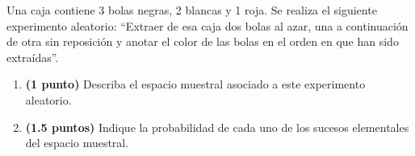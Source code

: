 
Una caja contiene 3 bolas negras, 2 blancas y 1 roja. Se realiza el siguiente experimento aleatorio: ``Extraer de esa caja dos bolas al azar, una a continuación de otra sin reposición y anotar el color de las bolas en el orden en que han sido extraídas''.
\begin{enumerate}[label=\alph*)]
\item \textbf{(1 punto)} Describa el espacio muestral asociado a este experimento aleatorio.
\item \textbf{(1.5 puntos)} Indique la probabilidad de cada uno de los sucesos elementales del espacio muestral.
\end{enumerate}
